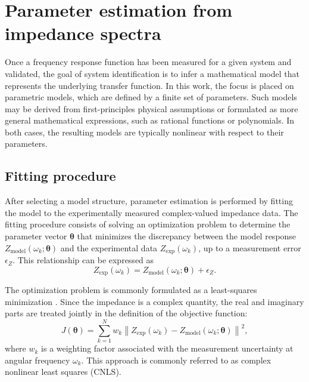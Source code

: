\section{Parameter estimation from impedance spectra}

Once a frequency response function has been measured for a given system and validated, the goal of system identification is to infer a mathematical model that represents the underlying transfer function.
In this work, the focus is placed on parametric models, which are defined by a finite set of parameters.
Such models may be derived from first-principles physical assumptions or formulated as more general mathematical expressions, such as rational functions or polynomials.
In both cases, the resulting models are typically nonlinear with respect to their parameters.

\subsection{Fitting procedure}
\label{sec:fitting-sys-id}
After selecting a model structure, parameter estimation is performed by fitting the model to the experimentally measured complex-valued impedance data.
The fitting procedure consists of solving an optimization problem to determine the parameter vector \( \boldsymbol{\theta} \) that minimizes the discrepancy between the model response \( Z_{\text{model}}(\omega_k; \boldsymbol{\theta}) \) and the experimental data \( Z_{\text{exp}}(\omega_k) \), up to a measurement error \( \epsilon_Z \).
This relationship can be expressed as
\begin{equation}
Z_{\text{exp}}(\omega_k) =
Z_{\text{model}}(\omega_k; \boldsymbol{\theta}) + \epsilon_Z.
\end{equation}

The optimization problem is commonly formulated as a least-squares minimization \cite{pintelonTransferFunctions1994,orazemEIS}.
Since the impedance is a complex quantity, the real and imaginary parts are treated jointly in the definition of the objective function:
\begin{equation}
J(\boldsymbol{\theta}) =
\sum_{k=1}^{N}
w_k
\left\|
Z_{\text{exp}}(\omega_k) -
Z_{\text{model}}(\omega_k; \boldsymbol{\theta})
\right\|^2,
\label{eq:nlls_basic}
\end{equation}
where \( w_k \) is a weighting factor associated with the measurement uncertainty at angular frequency \( \omega_k \).
This approach is commonly referred to as complex nonlinear least squares (CNLS).

